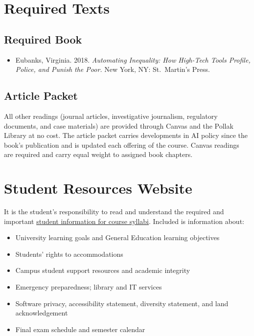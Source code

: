 \documentclass[12pt]{article}
\begin{document}
\section*{Required Texts}

\subsection*{Required Book}

\begin{itemize}
    \item Eubanks, Virginia. 2018. \emph{Automating Inequality: How High-Tech Tools Profile, Police, and Punish the Poor.} New York, NY: St.\ Martin's Press.
\end{itemize}

\subsection*{Article Packet}

All other readings (journal articles, investigative journalism, regulatory documents, and case materials) are provided through Canvas and the Pollak Library at no cost. The article packet carries developments in AI policy since the book's publication and is updated each offering of the course. Canvas readings are required and carry equal weight to assigned book chapters.

\section*{Student Resources Website}
It is the student's responsibility to read and understand the required and important \href{https://fdc.fullerton.edu/teaching/student-info-syllabi.html}{student information for course syllabi}. Included is information about:

\begin{itemize}
\item University learning goals and General Education learning objectives
\item Students' rights to accommodations
\item Campus student support resources and academic integrity
\item Emergency preparedness; library and IT services
\item Software privacy, accessibility statement, diversity statement, and land acknowledgement
\item Final exam schedule and semester calendar
\end{itemize}
\end{document}
